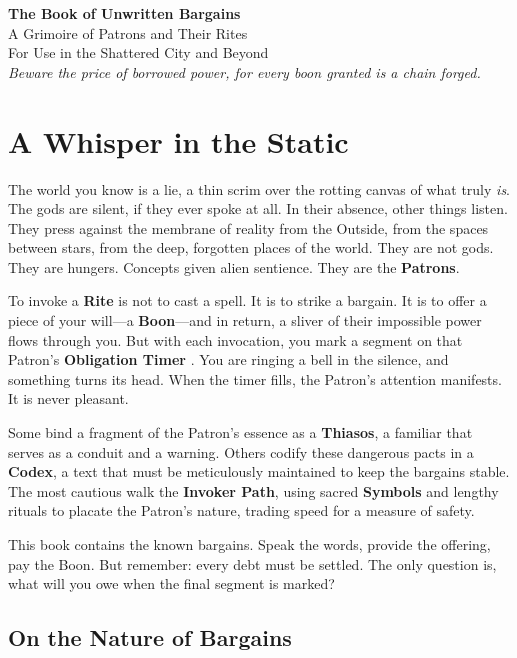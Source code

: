 \documentclass[10pt, twoside]{book}
\begin{document}
\begin{titlepage}
    \centering
    {\Huge\bfseries The Book of Unwritten Bargains}\\[2cm]
    {\Large A Grimoire of Patrons and Their Rites}\\[1cm]
    {\large For Use in the Shattered City and Beyond}\\[3cm]
    \vfill
    {\itshape Beware the price of borrowed power, for every boon granted is a chain forged.}\\
\end{titlepage}

\chapter*{A Whisper in the Static}

The world you know is a lie, a thin scrim over the rotting canvas of what truly \textit{is}. The gods are silent, if they ever spoke at all. In their absence, other things listen. They press against the membrane of reality from the Outside, from the spaces between stars, from the deep, forgotten places of the world. They are not gods. They are hungers. Concepts given alien sentience. They are the \textbf{Patrons}.

To invoke a \textbf{Rite} is not to cast a spell. It is to strike a bargain. It is to offer a piece of your will---a \textbf{Boon}---and in return, a sliver of their impossible power flows through you. But with each invocation, you mark a segment on that Patron's \textbf{Obligation Timer }. You are ringing a bell in the silence, and something turns its head. When the timer fills, the Patron's attention manifests. It is never pleasant.

Some bind a fragment of the Patron's essence as a \textbf{Thiasos}, a familiar that serves as a conduit and a warning. Others codify these dangerous pacts in a \textbf{Codex}, a text that must be meticulously maintained to keep the bargains stable. The most cautious walk the \textbf{Invoker Path}, using sacred \textbf{Symbols} and lengthy rituals to placate the Patron's nature, trading speed for a measure of safety.

This book contains the known bargains. Speak the words, provide the offering, pay the Boon. But remember: every debt must be settled. The only question is, what will you owe when the final segment is marked?

\section*{On the Nature of Bargains}
\end{document}

